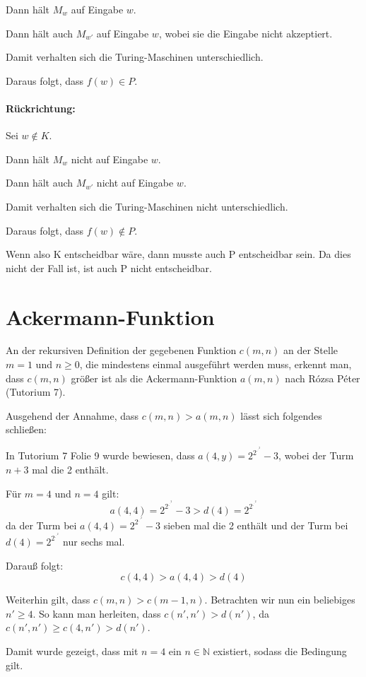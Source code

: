 \documentclass[10pt,leqno ]{article}
\begin{document}
Dann hält $M_w$ auf Eingabe $w$.

Dann hält auch $M_{w'}$ auf Eingabe $w$, wobei sie die Eingabe nicht akzeptiert.

Damit verhalten sich die Turing-Maschinen unterschiedlich.

Daraus folgt, dass $f(w) \in P$.

\paragraph{Rückrichtung:}
Sei $w \notin K$.

Dann hält $M_w$ nicht auf Eingabe $w$.

Dann hält auch $M_{w'}$ nicht auf Eingabe $w$.

Damit verhalten sich die Turing-Maschinen nicht unterschiedlich.

Daraus folgt, dass $f(w) \notin P$.


\begin{flushleft}
    Wenn also K entscheidbar wäre, dann musste auch P entscheidbar sein. Da dies nicht der Fall ist, ist auch P nicht entscheidbar. 
\end{flushleft}

\pagebreak

\section{Ackermann-Funktion}

An der rekursiven Definition der gegebenen Funktion $c(m,n)$ an der Stelle $m=1$ und  $n \geq 0$, die mindestens einmal ausgeführt werden muss, erkennt man, dass  $c(m,n)$ größer ist als die Ackermann-Funktion $a(m,n)$ nach Rózsa Péter (Tutorium 7). 
\begin{flushleft}
Ausgehend der Annahme, dass $c(m,n) > a(m,n)$ lässt sich folgendes schließen: 
\end{flushleft}

\begin{flushleft}
In Tutorium 7 Folie 9 wurde bewiesen, dass $a(4,y)=2^{2^{.^{.^{2}}}}-3$, wobei der Turm $n+3$ mal die 2 enthält.
\end{flushleft}

\begin{flushleft}
    Für $m=4$ und $n=4$ gilt: \[ a(4,4)= 2^{2^{.^{.^{2}}}} - 3 > d(4) =  2^{2^{.^{.^{2}}}} \] da der Turm bei $a(4,4)= 2^{2^{.^{.^{2}}}} - 3$ sieben mal die 2 enthält und der Turm bei $d(4) =  2^{2^{.^{.^{2}}}}$ nur sechs mal. 
    
    Darauß folgt: \[ c(4,4) > a(4,4) > d(4)  \]
\end{flushleft}

\begin{flushleft}
    Weiterhin gilt, dass $c(m,n) > c(m-1,n)$. Betrachten wir nun ein beliebiges $n' \ge 4$. So kann man herleiten, dass $c(n',n') > d(n')$, da $c(n',n') \ge c(4,n') > d(n')$.
\end{flushleft}

Damit wurde gezeigt, dass mit $n = 4 $ ein $n \in \mathbb{N}$ existiert, sodass  die Bedingung gilt.
\end{document}
